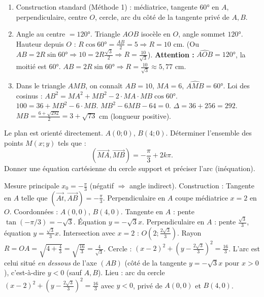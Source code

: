 \documentclass[11pt]{article}
\begin{document}
\begin{corrige}[Exercice 1]
\begin{enumerate}
\item Construction standard (Méthode 1) : médiatrice, tangente $60°$ en $A$, perpendiculaire, centre $O$, cercle, arc du côté de la tangente privé de $A,B$.
\item Angle au centre $= 120°$. Triangle $AOB$ isocèle en $O$, angle sommet $120°$. Hauteur depuis $O$ : $R\cos 60° = \frac{AB}{2} = 5 \Rightarrow R = 10$ cm. (Ou $AB = 2R\sin 60° \Rightarrow 10 = 2R\frac{\sqrt{3}}{2} \Rightarrow R = \frac{10}{\sqrt{3}}$). \textbf{Attention :} $\widehat{AOB}=120°$, la moitié est $60°$. $AB = 2R\sin 60° \Rightarrow R = \frac{10}{\sqrt{3}} \approx 5,77$ cm.
\item Dans le triangle $AMB$, on connaît $AB=10$, $MA=6$, $\widehat{AMB}=60°$. Loi des cosinus : $AB^2 = MA^2 + MB^2 - 2\cdot MA\cdot MB\cos 60°$. $100 = 36 + MB^2 - 6\cdot MB$. $MB^2 - 6MB - 64 = 0$. $\Delta = 36 + 256 = 292$. $MB = \frac{6+\sqrt{292}}{2} = 3+\sqrt{73}$ cm (longueur positive).
\end{enumerate}
\end{corrige}

\begin{exercice}
Le plan est orienté directement. $A(0;0)$, $B(4;0)$. Déterminer l'ensemble des points $M(x;y)$ tels que :
\[
(\overrightarrow{MA},\overrightarrow{MB}) = -\frac{\pi}{3} + 2k\pi.
\]
Donner une équation cartésienne du cercle support et préciser l'arc (inéquation).
\end{exercice}

\begin{corrige}[Exercice 2]
Mesure principale $x_0 = -\frac{\pi}{3}$ (négatif $\Rightarrow$ angle indirect).
Construction : Tangente en $A$ telle que $(\overrightarrow{At},\overrightarrow{AB}) = -\frac{\pi}{3}$. Perpendiculaire en $A$ coupe médiatrice $x=2$ en $O$.
Coordonnées : $A(0,0)$, $B(4,0)$. Tangente en $A$ : pente $\tan(-\pi/3)=-\sqrt{3}$. Équation $y=-\sqrt{3}x$. Perpendiculaire en $A$ : pente $\frac{\sqrt{3}}{3}$, équation $y=\frac{\sqrt{3}}{3}x$. Intersection avec $x=2$ : $O(2; \frac{2\sqrt{3}}{3})$.
Rayon $R = OA = \sqrt{4 + \frac{4}{3}} = \sqrt{\frac{16}{3}} = \frac{4}{\sqrt{3}}$.
Cercle : $(x-2)^2 + (y-\frac{2\sqrt{3}}{3})^2 = \frac{16}{3}$.
L'arc est celui situé \emph{en dessous} de l'axe $(AB)$ (côté de la tangente $y=-\sqrt{3}x$ pour $x>0$), c'est-à-dire $y < 0$ (sauf $A,B$).
Lieu : arc du cercle $(x-2)^2 + (y-\frac{2\sqrt{3}}{3})^2 = \frac{16}{3}$ avec $y < 0$, privé de $A(0,0)$ et $B(4,0)$.
\end{corrige}
\end{document}
